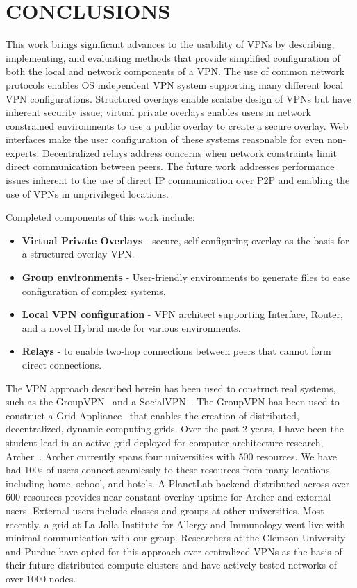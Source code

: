 \chapter{CONCLUSIONS}
\label{chap:conclusion}
This work brings significant advances to the usability of VPNs by describing,
implementing, and evaluating methods that provide simplified configuration of
both the local and network components of a VPN.  The use of common network
protocols enables OS independent VPN system supporting many different local VPN
configurations.  Structured overlays enable scalabe design of VPNs but have
inherent security issue; virtual private overlays enables users in network
constrained environments to use a public overlay to create a secure overlay.
Web interfaces make the user configuration of these systems reasonable for even
non-experts.  Decentralized relays address concerns when network constraints
limit direct communication between peers.  The future work addresses
performance issues inherent to the use of direct IP communication over P2P and
enabling the use of VPNs in unprivileged locations.

Completed components of this work include:
\begin{itemize}
\item \textbf{Virtual Private Overlays} - secure, self-configuring overlay as
the basis for a structured overlay VPN.
\item \textbf{Group environments} - User-friendly environments to generate
files to ease configuration of complex systems.
\item \textbf{Local VPN configuration} - VPN architect supporting Interface,
Router, and a novel Hybrid mode for various environments.
\item \textbf{Relays} - to enable two-hop connections between peers that cannot
form direct connections.
\end{itemize}

The VPN approach described herein has been used to construct real systems,
such as the GroupVPN~\cite{gridappliance} and a SocialVPN~\cite{cops08}.  The
GroupVPN has been used to construct a Grid Appliance~\cite{grid_appliance} that
enables the creation of distributed, decentralized, dynamic computing grids.
Over the past 2 years, I have been the student lead in an active grid deployed
for computer architecture research, Archer~\cite{archer}.  Archer currently
spans four universities with 500 resources.  We have had 100s of users connect
seamlessly to these resources from many locations including home, school, and
hotels.  A PlanetLab backend distributed across over 600 resources provides
near constant overlay uptime for Archer and external users.  External users
include classes and groups at other universities.  Most recently, a grid at La
Jolla Institute for Allergy and Immunology went live with minimal communication
with our group.  Researchers at the Clemson University and Purdue have opted
for this approach over centralized VPNs as the basis of their future
distributed compute clusters and have actively tested networks of over 1000
nodes.
